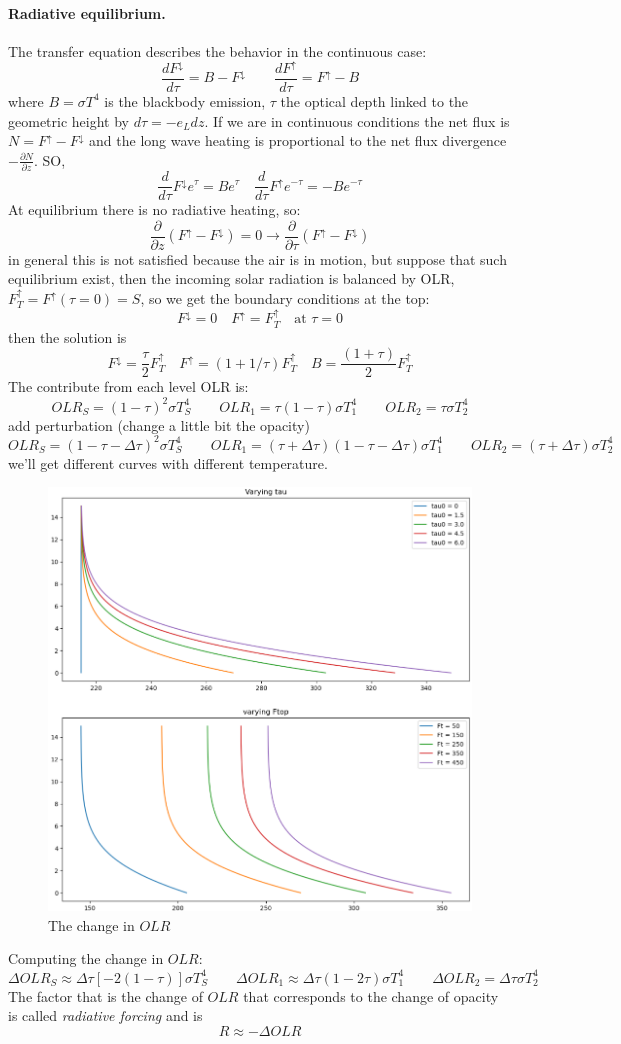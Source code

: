 \paragraph{Radiative equilibrium.} The transfer equation describes the behavior in the continuous case:
$$\frac{dF^{\downarrow}}{d\tau}=B-F^{\downarrow} \qquad  \frac{dF^{\uparrow}}{d\tau}=F^{\uparrow}-B$$
where $B=\sigma T^4$ is the blackbody emission, $\tau$ the optical depth linked to the geometric height by $d\tau=-e_Ldz$. If we are in continuous conditions the net flux is $N=F^{\uparrow}-F^{\downarrow}$ and the long wave heating is proportional to the net flux divergence $-\frac{\partial N}{\partial z}$. SO,
$$\frac{d}{d\tau}F^{\downarrow}e^{\tau}=Be^{\tau}\quad \frac{d}{d\tau}F^{\uparrow}e^{-\tau}=-Be^{-\tau}$$
At equilibrium there is no radiative heating, so:
$$\frac{\partial}{\partial z}(F^{\uparrow}-F^{\downarrow})=0\rightarrow\frac{\partial}{\partial\tau}(F^{\uparrow}-F^{\downarrow})$$
in general this is not satisfied because the air is in motion, but suppose that such equilibrium exist, then the incoming solar radiation is balanced by OLR, $F^{\uparrow}_T=F^{\uparrow}(\tau=0)=S$, so we get the boundary conditions at the top:
$$F^{\downarrow}=0 \quad F^{\uparrow}=F^{\uparrow}_T \quad \text{at} \, \, \tau=0$$
then the solution is
$$F^{\downarrow}=\frac{\tau}{2}F^{\uparrow}_T \quad F^{\uparrow}=(1+1/\tau )F^{\uparrow}_T \quad B=\frac{(1+\tau)}{2}F^{\uparrow}_T $$
The contribute from each level OLR is:
$$OLR_S=(1-\tau)^2\sigma T^4_S \qquad OLR_1=\tau(1-\tau)\sigma T_1^4 \qquad OLR_2=\tau\sigma T_2^4$$
add perturbation (change a little bit the opacity)
$$OLR_S=(1-\tau-\Delta\tau)^2\sigma T^4_S \qquad OLR_1=(\tau+\Delta\tau)(1-\tau-\Delta\tau)\sigma T_1^4 \qquad OLR_2=(\tau+\Delta\tau)\sigma T_2^4$$
we'll get different curves with different temperature.
\begin{figure}[h!]
	\centering
	\includegraphics[width=0.5\linewidth]{uploads/Screenshot 2024-11-20 125556.png}
	\caption{The change in $OLR$}
	\label{fig:enter-label}
\end{figure}
Computing the change in $OLR$:
$$\Delta OLR_S\approx\Delta\tau[-2(1-\tau)]\sigma T_S^4 \qquad \Delta OLR_1\approx\Delta\tau(1-2\tau)\sigma T_1^4 \qquad \Delta OLR_2=\Delta\tau\sigma T_2^4$$
The factor that is the change of $OLR$ that corresponds to the change of opacity is called \textit{radiative forcing} and is
\begin{equation}\label{eq.radiative forcing}
	R\approx-\Delta OLR
\end{equation}
